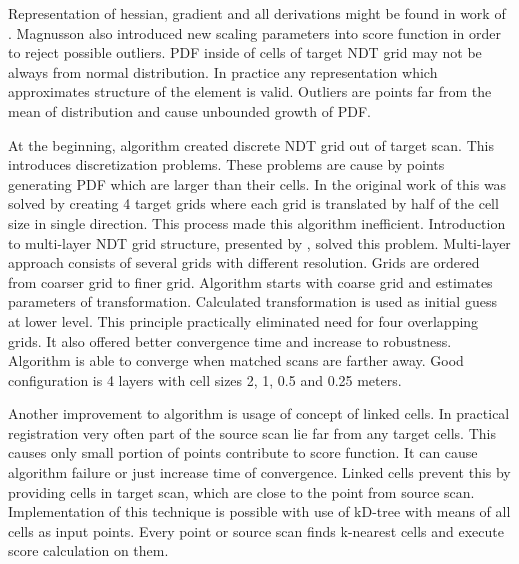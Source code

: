 Representation of hessian, gradient and all derivations might be found in work of \cite{magnusson09}. Magnusson also introduced new scaling parameters into score function in order to reject possible outliers. \gls{PDF} inside of cells of target \gls{NDT} grid may not be always from normal distribution. In practice any representation which approximates structure of the element is valid. Outliers are points far from the mean of distribution and cause unbounded growth of \gls{PDF}.

At the beginning, algorithm created discrete \gls{NDT} grid out of target scan. This introduces discretization problems. These problems are cause by points generating \gls{PDF} which are larger than their cells. In the original work of \cite{Biber03} this was solved by creating 4 target grids where each grid is translated by half of the cell size in single direction. This process made this algorithm inefficient. Introduction to multi-layer \gls{NDT} grid structure, presented by \cite{ulas20113d}, solved this problem. Multi-layer approach consists of several grids with different resolution. Grids are ordered from coarser grid to finer grid. Algorithm starts with coarse grid and estimates parameters of transformation. Calculated transformation is used as initial guess at lower level. This principle practically eliminated need for four overlapping grids. It also offered better convergence time and increase to robustness. Algorithm is able to converge when matched scans are farther away. Good configuration is 4 layers with cell sizes 2, 1, 0.5 and 0.25 meters. 

Another improvement to algorithm is usage of concept of linked cells. In practical registration very often part of the source scan lie far from any target cells. This causes only small portion of points contribute to score function. It can cause algorithm failure or just increase time of convergence. Linked cells prevent this by providing cells in target scan, which are close to the point from source scan. Implementation of this technique is possible with use of kD-tree with means of all cells as input points. Every point or source scan finds k-nearest cells and execute score calculation on them.

